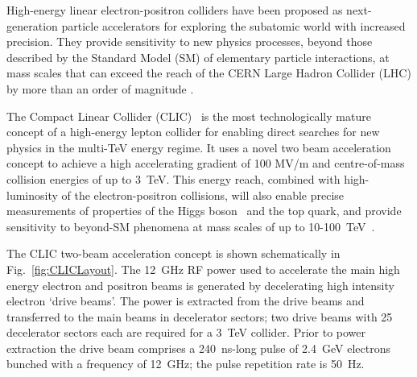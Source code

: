 \documentclass[%
 reprint,
 superscriptaddress,
 amsmath,
 amssymb,
 prl,
]{revtex4-1}
\begin{document}



High-energy linear electron-positron colliders have been proposed as 
next-generation particle accelerators for exploring the subatomic world with 
increased precision. They provide sensitivity to new physics processes, 
beyond those described by the Standard Model (SM) of elementary particle 
interactions, at mass scales that can exceed the reach of the CERN 
Large Hadron Collider (LHC) by more than an order of magnitude 
\cite{CLIC-staging}.

The Compact Linear Collider (CLIC)~\cite{CLICCDR} is the most technologically 
mature concept of a high-energy lepton collider for enabling direct searches 
for new physics in the multi-TeV energy regime. It uses a novel two 
beam acceleration concept to achieve a high accelerating gradient of 100 MV/m 
and centre-of-mass collision energies of up to 3~TeV. This energy reach, 
combined with high-luminosity of the electron-positron collisions, will also 
enable precise measurements of properties of the Higgs boson~\cite{CLIC-Higgs} 
and the top quark, and provide sensitivity to beyond-SM phenomena at mass 
scales of up to 10-100~TeV~\cite{CLIC-staging}.

The CLIC two-beam acceleration concept is shown schematically in 
Fig.~\ref{fig:CLICLayout}. The 12~GHz RF power used to accelerate the main high 
energy electron and positron beams is generated by decelerating high intensity 
electron `drive beams'. The power is extracted from the drive beams and 
transferred to the main beams in decelerator sectors; two drive 
beams with 25 decelerator sectors each are required for a 3~TeV collider. Prior 
to power extraction the drive beam comprises a 240~ns-long pulse of 2.4~GeV 
electrons bunched with a frequency of 12~GHz; the pulse repetition rate is 
50~Hz.
\end{document}
